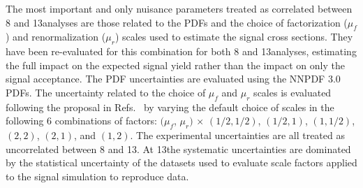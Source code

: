 \begin{table}[htb]
  \centering
  \caption{Correlation of systematic uncertainties in the signal prediction across analyses. A ``yes'' signifies 100\% correlation, and ``no'' means uncorrelated. The asterisk indicates information based on distribution and on yields.}
  \label{tab:correlations}
\end{table}

The most important and only nuisance parameters treated as correlated between 8 and 13\TeV analyses are those related to the PDFs and the choice of factorization ($\mu_{f}$) and renormalization ($\mu_{r}$) scales used to estimate the signal cross sections.
They have been re-evaluated for this combination for both 8 and 13\TeV analyses, estimating the full impact on the expected signal yield rather than the impact on only the signal acceptance.
The PDF uncertainties are evaluated using the NNPDF 3.0~\cite{Ball:2014uwa} PDFs.
The uncertainty related to the choice of $\mu_{f}$ and $\mu_{r}$ scales is evaluated following the proposal in Refs.~\cite{Cacciari:2003fi,Catani:2003zt} by varying the default choice of scales in the following 6 combinations of factors:
$(\mu_{f}$, $\mu_{r})$ $\times$ $(1/2, 1/2)$, $(1/2, 1)$, $(1,1/2)$, $(2, 2)$, $(2, 1)$, and $(1, 2)$.
The experimental uncertainties are all treated as uncorrelated between 8 and 13\TeV. At 13\TeV the systematic uncertainties are dominated by the statistical uncertainty of the datasets used to evaluate scale factors applied to the signal simulation to reproduce data.

